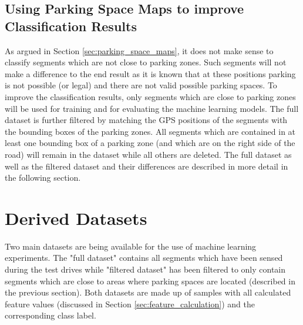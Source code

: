 \subsection{Using Parking Space Maps to improve Classification Results}
\label{sec:parking_space_maps_improve_classification}

As argued in Section \ref{sec:parking_space_maps}, it does not make sense to classify segments which are not close to parking zones. Such segments will not make a difference to the end result as it is known that at these positions parking is not possible (or legal) and there are not valid possible parking spaces. 
To improve the classification results, only segments which are close to parking zones will be used for training and for evaluating the machine learning models. The full dataset is further filtered by matching the GPS positions of the segments with the bounding boxes of the parking zones. All segments which are contained in at least one bounding box of a parking zone (and which are on the right side of the road) will remain in the dataset while all others are deleted. The full dataset as well as the filtered dataset and their differences are described in more detail in the following section.









\section{Derived Datasets}
\label{sec:derived_dataset}

Two main datasets are being available for the use of machine learning experiments. The "full dataset" contains all segments which have been sensed during the test drives while "filtered dataset" has been filtered to only contain segments which are close to areas where parking spaces are located (described in the previous section). Both datasets are made up of samples with all calculated feature values (discussed in Section \ref{sec:feature_calculation}) and the corresponding class label.

